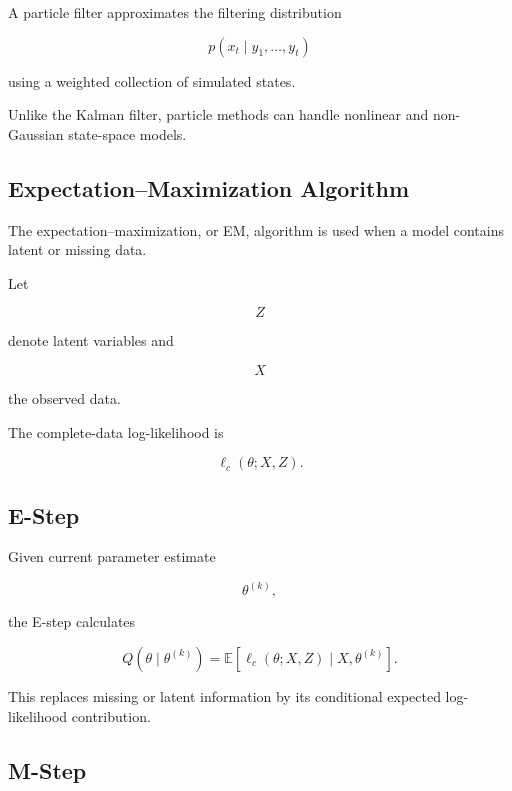 A particle filter approximates the filtering distribution

\[
\boxed{
p
(
x_t
\mid
y_1,\ldots,y_t
)
}
\]

using a weighted collection of simulated states.

Unlike the Kalman filter, particle methods can handle nonlinear and
non-Gaussian state-space models.

\subsection{Expectation--Maximization Algorithm}
\label{subsec:em-algorithm}

The expectation--maximization, or EM, algorithm is used when a model
contains latent or missing data.

Let

\[
Z
\]

denote latent variables and

\[
X
\]

the observed data.

The complete-data log-likelihood is

\[
\boxed{
\ell_c
(
\theta;X,Z
).
}
\]

\subsection{E-Step}
\label{subsec:em-e-step}

Given current parameter estimate

\[
\theta^{(k)},
\]

the E-step calculates

\[
\boxed{
Q
(
\theta\mid\theta^{(k)}
)
=
\mathbb{E}
\left[
\ell_c
(
\theta;X,Z
)
\mid
X,\theta^{(k)}
\right].
}
\]

This replaces missing or latent information by its conditional expected
log-likelihood contribution.

\subsection{M-Step}
\label{subsec:em-m-step}

